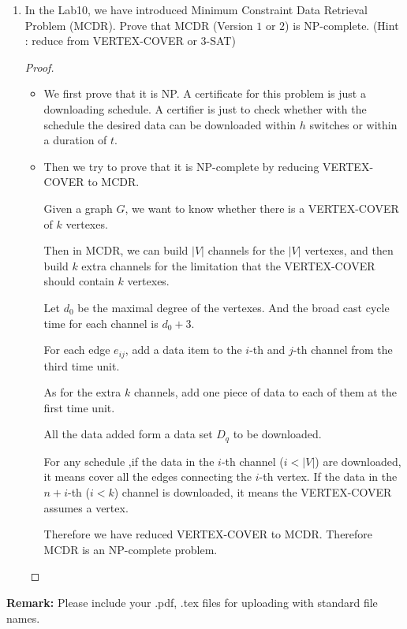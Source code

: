 \documentclass[12pt,a4paper]{article}
\theoremstyle{definition}
\begin{document}
\begin{enumerate}
	\item In the Lab10, we have introduced Minimum Constraint Data Retrieval Problem (MCDR). Prove that MCDR (Version $1$ or $2$) is NP-complete. (Hint : reduce from VERTEX-COVER or $3$-SAT)
	\begin{proof}
        \begin{itemize}
            \item 
            We first prove that it is NP. A certificate for this problem is just a downloading schedule. A certifier is just to check whether with the schedule the desired data can be downloaded within $h$ switches or within a duration of $t$.
            \item
            Then we try to prove that it is NP-complete by reducing VERTEX-COVER to MCDR.
            
            Given a graph $G$, we want to know whether there is a VERTEX-COVER of $k$ vertexes.
            
            Then in MCDR, we can build $|V|$ channels for the $|V|$ vertexes, and then build $k$ extra channels for the limitation that the VERTEX-COVER should contain $k$ vertexes.
            
            Let $d_0$ be the maximal degree of the vertexes. And the broad cast cycle time for each channel is $d_0+3$.
            
            For each edge $e_{ij}$, add a data item to the $i$-th and $j$-th channel from the third time unit.
            
            As for the extra $k$ channels, add one piece of data to each of them at the first time unit.
            
            All the data added form a data set $D_q$ to be downloaded.
            
            For any schedule ,if the data in the $i$-th channel ($i<|V|$) are downloaded, it means cover all the edges connecting the $i$-th vertex. If the data in the $n+i$-th ($i<k$) channel is downloaded, it means the VERTEX-COVER assumes a vertex. 
            
            Therefore we have reduced VERTEX-COVER to MCDR. Therefore MCDR is an NP-complete problem.
        \end{itemize}
    \end{proof}

\end{enumerate}

\textbf{Remark:} Please include your .pdf, .tex files for uploading with standard file names.




\end{document}
